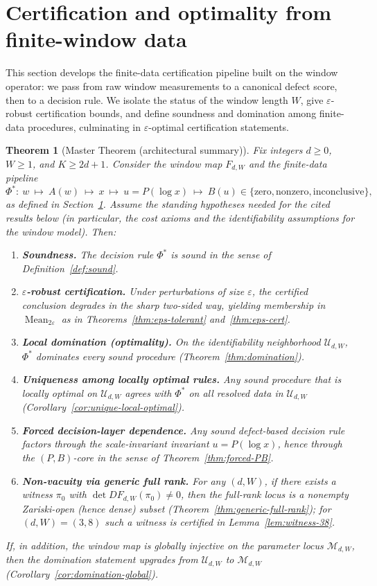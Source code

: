 \documentclass[11pt,reqno]{amsart}
\newtheorem{theorem}{Theorem}[section]
\theoremstyle{definition}
\theoremstyle{remark}
\newcommand{\1}{\mathbf{1}}
\newcommand{\zero}{\mathrm{zero}}
\newcommand{\nonzero}{\mathrm{nonzero}}
\newcommand{\inconclusive}{\mathrm{inconclusive}}
\newcommand{\Mean}{\operatorname{Mean}}
\begin{document}
\section{Certification and optimality from finite-window data}
\label{sec:cert-opt}
This section develops the finite-data certification pipeline built on the window operator:
we pass from raw window measurements to a canonical defect score, then to a decision rule.
We isolate the status of the window length $W$, give $\varepsilon$-robust certification bounds,
and define soundness and domination among finite-data procedures, culminating in
$\varepsilon$-optimal certification statements.



\begin{theorem}[Master Theorem (architectural summary)]\label{thm:master}
Fix integers $d\ge 0$, $W\ge 1$, and $K\ge 2d+1$.  Consider the window map $F_{d,W}$ and the finite-data pipeline
\[
\Phi^\ast:\ w\ \mapsto\ A(w)\ \mapsto\ x\ \mapsto\ u=P(\log x)\ \mapsto\ B(u)\in\{\zero,\nonzero,\inconclusive\},
\]
as defined in Section~\ref{sec:cert-opt}.  Assume the standing hypotheses needed for the cited results below
(in particular, the cost axioms and the identifiability assumptions for the window model).  Then:
\begin{enumerate}[label=\textup{(\roman*)},leftmargin=2.2em]
\item \textbf{Soundness.}  The decision rule $\Phi^\ast$ is sound in the sense of Definition~\ref{def:sound}.
\item \textbf{$\varepsilon$-robust certification.}  Under perturbations of size $\varepsilon$, the certified conclusion degrades in the sharp two-sided way, yielding membership in $\Mean_{2\varepsilon}$ as in Theorems~\ref{thm:eps-tolerant} and~\ref{thm:eps-cert}.
\item \textbf{Local domination (optimality).}  On the identifiability neighborhood $\mathcal U_{d,W}$, $\Phi^\ast$ dominates every sound procedure (Theorem~\ref{thm:domination}).
\item \textbf{Uniqueness among locally optimal rules.}  Any sound procedure that is locally optimal on $\mathcal U_{d,W}$ agrees with $\Phi^\ast$ on all resolved data in $\mathcal U_{d,W}$ (Corollary~\ref{cor:unique-local-optimal}).
\item \textbf{Forced decision-layer dependence.}  Any sound defect-based decision rule factors through the scale-invariant invariant $u=P(\log x)$, hence through the $(P,B)$-core in the sense of Theorem~\ref{thm:forced-PB}.
\item \textbf{Non-vacuity via generic full rank.}  For any $(d,W)$, if there exists a witness $\pi_0$ with $\det DF_{d,W}(\pi_0)\neq 0$, then the full-rank locus is a nonempty Zariski-open (hence dense) subset (Theorem~\ref{thm:generic-full-rank}); for $(d,W)=(3,8)$ such a witness is certified in Lemma~\ref{lem:witness-38}.
\end{enumerate}
If, in addition, the window map is globally injective on the parameter locus $\mathcal M_{d,W}$, then the domination statement upgrades from $\mathcal U_{d,W}$ to $\mathcal M_{d,W}$ (Corollary~\ref{cor:domination-global}).
\end{theorem}
\end{document}
